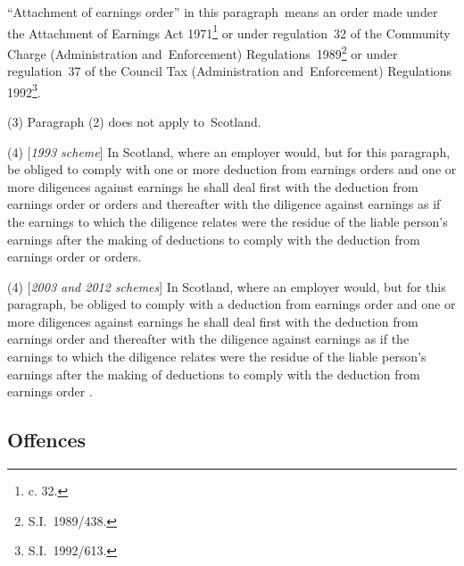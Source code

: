 \documentclass[12pt,a4paper]{article}
\begin{document}
“Attachment of earnings order” in this paragraph~means an order made under the Attachment of Earnings Act 1971\footnote{ c. 32.} or under regulation~32 of the Community Charge (Administration and~Enforcement) Regulations~1989\footnote{\frenchspacing S.I.~1989/438.}
or under regulation~37 of the Council Tax (Administration and~Enforcement) Regulations 1992\footnote{\frenchspacing  S.I.~1992/613.}. %

(3) Paragraph (2) does not apply to~Scotland.

(4) [\emph{1993 scheme}] In Scotland, where an employer would, but for this paragraph, be obliged to comply with one or more deduction from earnings orders and one or more diligences against earnings he shall deal first with the deduction from earnings order or orders and thereafter with the diligence against earnings as if the earnings to which the diligence relates were the residue of the liable person’s earnings after the making of deductions to comply with the deduction from earnings order or orders.

(4) [\emph{2003 and 2012 schemes}] In Scotland, where an employer would, but for this paragraph, be obliged to comply with 
a deduction from earnings order  %
and one or more diligences against earnings he shall deal first with the deduction from earnings order
and thereafter with the diligence against earnings as if the earnings to which the diligence relates were the residue of the liable person’s earnings after the making of deductions to comply with the deduction from earnings order%
.

\subsection[25. Offences]{Offences}
\end{document}
